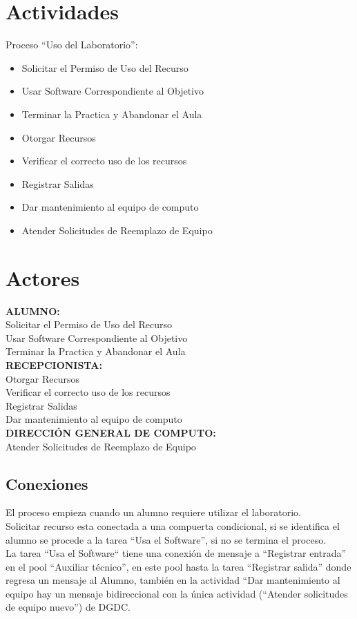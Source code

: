 \documentclass[spanish,12pt,letterpapper]{article}
\begin{document}
	\section{Actividades}
	Proceso ``Uso del Laboratorio'':\\
	
	\begin{itemize}
	\item Solicitar el Permiso de Uso del Recurso
	\item Usar Software Correspondiente al Objetivo
	\item Terminar la Practica y Abandonar el Aula
	\item Otorgar Recursos
	\item Verificar el correcto uso de los recursos
	\item Registrar Salidas
	\item Dar mantenimiento al equipo de computo
	\item Atender Solicitudes de Reemplazo de Equipo
	\end{itemize}
	
	\section{Actores}
	\textbf{ALUMNO:\\}	
	Solicitar el Permiso de Uso del Recurso\\
	Usar Software Correspondiente al Objetivo\\
	Terminar la Practica y Abandonar el Aula\\
	
	\textbf{RECEPCIONISTA:\\}	
	Otorgar Recursos\\
	Verificar el correcto uso de los recursos\\
	Registrar Salidas\\
	Dar mantenimiento al equipo de computo\\

	\textbf{DIRECCIÓN GENERAL DE COMPUTO:\\}
	Atender Solicitudes de Reemplazo de Equipo
	
	\subsection{Conexiones}
	El proceso empieza cuando un alumno requiere utilizar el laboratorio.\\
	Solicitar recurso esta conectada a una compuerta condicional, si se identifica el alumno se procede a la tarea ``Usa el Software'', si no se termina el proceso.\\
	La tarea ``Usa el Software`` tiene una conexión de mensaje a ``Registrar entrada'' en el pool ``Auxiliar técnico'', en este pool hasta la tarea ``Registrar salida'' donde regresa un mensaje al Alumno, también en la actividad ``Dar mantenimiento al equipo hay un mensaje bidireccional con la única actividad (``Atender solicitudes de equipo nuevo'') de DGDC.
	
\end{document}
